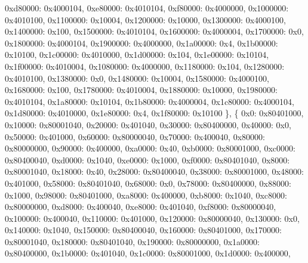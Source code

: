 \begin{DoxyCodeInclude}
            0xd80000: 0x4000104,
            0xe80000: 0x4010104,
            0xf80000: 0x4000000,
            0x1000000: 0x4010100,
            0x1100000: 0x10004,
            0x1200000: 0x10000,
            0x1300000: 0x4000100,
            0x1400000: 0x100,
            0x1500000: 0x4010104,
            0x1600000: 0x4000004,
            0x1700000: 0x0,
            0x1800000: 0x4000104,
            0x1900000: 0x4000000,
            0x1a00000: 0x4,
            0x1b00000: 0x10100,
            0x1c00000: 0x4010000,
            0x1d00000: 0x104,
            0x1e00000: 0x10104,
            0x1f00000: 0x4010004,
            0x1080000: 0x4000000,
            0x1180000: 0x104,
            0x1280000: 0x4010100,
            0x1380000: 0x0,
            0x1480000: 0x10004,
            0x1580000: 0x4000100,
            0x1680000: 0x100,
            0x1780000: 0x4010004,
            0x1880000: 0x10000,
            0x1980000: 0x4010104,
            0x1a80000: 0x10104,
            0x1b80000: 0x4000004,
            0x1c80000: 0x4000104,
            0x1d80000: 0x4010000,
            0x1e80000: 0x4,
            0x1f80000: 0x10100
        \},
        \{
            0x0: 0x80401000,
            0x10000: 0x80001040,
            0x20000: 0x401040,
            0x30000: 0x80400000,
            0x40000: 0x0,
            0x50000: 0x401000,
            0x60000: 0x80000040,
            0x70000: 0x400040,
            0x80000: 0x80000000,
            0x90000: 0x400000,
            0xa0000: 0x40,
            0xb0000: 0x80001000,
            0xc0000: 0x80400040,
            0xd0000: 0x1040,
            0xe0000: 0x1000,
            0xf0000: 0x80401040,
            0x8000: 0x80001040,
            0x18000: 0x40,
            0x28000: 0x80400040,
            0x38000: 0x80001000,
            0x48000: 0x401000,
            0x58000: 0x80401040,
            0x68000: 0x0,
            0x78000: 0x80400000,
            0x88000: 0x1000,
            0x98000: 0x80401000,
            0xa8000: 0x400000,
            0xb8000: 0x1040,
            0xc8000: 0x80000000,
            0xd8000: 0x400040,
            0xe8000: 0x401040,
            0xf8000: 0x80000040,
            0x100000: 0x400040,
            0x110000: 0x401000,
            0x120000: 0x80000040,
            0x130000: 0x0,
            0x140000: 0x1040,
            0x150000: 0x80400040,
            0x160000: 0x80401000,
            0x170000: 0x80001040,
            0x180000: 0x80401040,
            0x190000: 0x80000000,
            0x1a0000: 0x80400000,
            0x1b0000: 0x401040,
            0x1c0000: 0x80001000,
            0x1d0000: 0x400000,

\end{DoxyCodeInclude}
